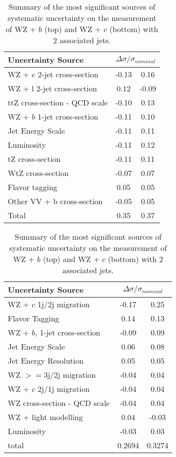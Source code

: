 \begin{table}[H]
  \centering
    \begin{tabular}{l|cc}
        \hline\hline
        Uncertainty Source & \multicolumn{2}{c}{$\Delta \sigma/\sigma_{nominal}$ }  \\
        \hline
        WZ + c 2-jet cross-section & -0.13 & 0.16 \\
        WZ + l 2-jet cross-section & 0.12 & -0.09 \\
        ttZ cross-section - QCD scale & -0.10 & 0.13 \\
        WZ + $b$ 1-jet cross-section & -0.11 & 0.10 \\
        Jet Energy Scale & -0.11 & 0.11 \\
        Luminosity & -0.11 & 0.12 \\
        tZ cross-section & -0.11 & 0.11 \\
        WtZ cross-section & -0.07 & 0.07 \\
        Flavor tagging  & 0.05 & 0.05 \\
        Other VV + b cross-section & -0.05 & 0.05 \\
        \hline
        Total & 0.35 & 0.37 \\
        \hline\hline
    \end{tabular}
    \vspace{0.3in}
    \begin{tabular}{l|cc}
        \hline\hline
        Uncertainty Source & \multicolumn{2}{c}{$\Delta \sigma/\sigma_{nominal}$ }  \\
        \hline
        WZ + $c$ 1j/2j migration & -0.17 & 0.25 \\
        Flavor Tagging & 0.14 & 0.13 \\
        WZ + $b$, 1-jet cross-section & -0.09 & 0.09 \\
        Jet Energy Scale & 0.06 & 0.08 \\
        Jet Energy Resolution & 0.05 & 0.05 \\
        WZ $>=$3j/2j migration & -0.04 & 0.04 \\
        WZ + $c$ 2j/1j migration & -0.04 & 0.04 \\
        WZ cross-section - QCD scale & -0.04 & 0.04 \\
        WZ + light modelling & 0.04 & -0.03 \\
        Luminosity & -0.03 & 0.03 \\
        \hline
        total & 0.2694 & 0.3274 \\
        \hline\hline
    \end{tabular}
    \caption{Summary of the most significant sources of systematic uncertainty on the measurement of WZ + $b$ (top) and WZ + $c$ (bottom) with 2 associated jets.}
    \label{tab:systematics_2j}
\end{table}

